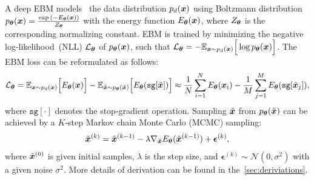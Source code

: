 \label{sec:ebms}
A deep EBM models~\citep{du2019implicit} the data distribution $p_d({\bm{x}})$ using Boltzmann distribution $p_{{\bm{\theta}}}({\bm{x}}) = \frac{\exp{(-E_{\bm{\theta}}({\bm{x}}))}}{Z_{\bm{\theta}}}$ with the energy function $E_{{\bm{\theta}}}({\bm{x}})$, where $Z_{\bm{\theta}}$ is the corresponding normalizing constant. 
EBM is trained by minimizing the negative log-likelihood~(NLL) $\mathcal{L}_{\bm{\theta}}$ of $p_{{\bm{\theta}}}({\bm{x}})$, such that $\mathcal{L}_{\bm{\theta}} = -{\mathbb{E}}_{{\bm{x}} \sim p_d({\bm{x}})} \Big[ \log p_{{\bm{\theta}}}({\bm{x}}) \Big]$.
The EBM loss can be reformulated as follows:
\vspace{-10pt}
\begin{equation}
\label{eq:ebm_loss}
\begin{aligned}
    \mathcal{L}_{{\bm{\theta}}} = {\mathbb{E}}_{{\bm{x}} \sim p_d({\bm{x}})} \Big[ {E_{{\bm{\theta}}}}({\bm{x}}) \Big] - {\mathbb{E}}_{\Tilde{{\bm{x}}} \sim p_{{\bm{\theta}}}(\Tilde{{\bm{x}}})} \Big[ {E_{{\bm{\theta}}}}(\texttt{sg}[ \Tilde{{\bm{x}}} ]) \Big]
    \approx \frac{1}{N}\sum_{i=1}^N {E_{{\bm{\theta}}}}({\bm{x}}_i) - \frac{1}{M}\sum_{j=1}^M {E_{{\bm{\theta}}}}( \texttt{sg}[\Tilde{{\bm{x}}}_j] ), 
\end{aligned}
\end{equation}
where $\texttt{sg}[\cdot]$ denotes the stop-gradient operation. 
Sampling $\Tilde{{\bm{x}}}$ from $p_{\bm{\theta}}(\Tilde{{\bm{x}}})$ can be achieved by a $K$-step Markov chain Monte Carlo (MCMC) sampling:
\begin{equation*}
\begin{aligned}
    \Tilde{{\bm{x}}}^{(k)} 
    = \Tilde{{\bm{x}}}^{(k-1)} - \lambda \nabla_{\Tilde{{\bm{x}}}} E_{\bm{\theta}}(\Tilde{{\bm{x}}}^{(k-1)}) + \bm{\epsilon}^{(k)},
\end{aligned}
\end{equation*}
where $\Tilde{{\bm{x}}}^{(0)}$ is given initial samples,  $\lambda$ is the step size, and $\bm{\epsilon}^{(k)} \sim \mathcal{N}(0, \sigma^2)$ with a given noise $\sigma^2$. 
More details of derivation can be found in the~\cref{sec:deriviations}.
